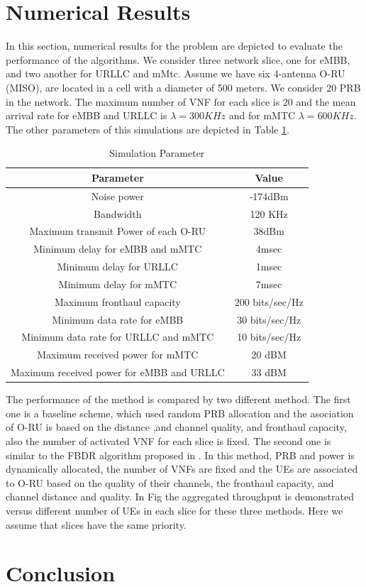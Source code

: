 \documentclass[conference]{IEEEtran}
\begin{document}
\section{Numerical Results}\label{NE}
In this section, numerical results for the problem are depicted to evaluate the performance of the algorithms. We consider three network slice, one for eMBB, and two another for URLLC and mMtc.
Assume we have six 4-antenna O-RU (MISO), are located in a cell with a diameter of 500 meters. We consider 20 PRB
in the network.
The maximum number of VNF for each slice is 20 and the mean arrival rate for eMBB and URLLC is $\lambda  = 300KHz$ and for mMTC $\lambda  = 600KHz$. 
The other parameters of this simulations are depicted in Table \ref{table:1a}.
\begin{table}
 \caption {Simulation Parameter} \label{table:1a}
 \begin{center}
  \begin{tabular}{||c c ||}
  \hline
Parameter & Value \\ [0.5ex]
  \hline\hline
  Noise power & -174dBm\\
  \hline
  Bandwidth & 120 KHz \\
  \hline
 Maximum transmit Power of each O-RU & 38dBm \\
  \hline
  Minimum delay for eMBB and mMTC &  4msec \\
  \hline
    Minimum delay for URLLC &  1msec \\
  \hline
  Minimum delay for mMTC &  7msec \\
  \hline
  Maximum fronthaul capacity  & 200 bits/sec/Hz \\
   \hline
  Minimum data rate for eMBB &  30 bits/sec/Hz \\ 
  \hline
   Minimum data rate for URLLC and mMTC &  10 bits/sec/Hz \\ 
  \hline
   Maximum received power for mMTC &  20 dBM \\ [.5ex]   
  \hline
    Maximum received power for eMBB and URLLC &  33 dBM \\ [.5ex]   
  \hline
 \end{tabular}
 \end{center}
 \end{table}
 The performance of the method is compared by two different method. The first one is a baseline scheme, which used random PRB allocation and the asociation of O-RU is based on the distance ,and channel quality, and fronthaul capacity, also the number of activated VNF for each slice is fixed. The second one is similar to the FBDR algorithm proposed in \cite{lee2018dynamic}. In this method, PRB and power is dynamically allocated, the number of VNFs are fixed and the UEs are associated to O-RU based on the quality of their channels, the fronthaul capacity, and channel distance and quality.
In Fig the aggregated throughput is demonstrated versus different number of UEs in each slice for these three methods. Here we assume that slices have the same priority.
\section{Conclusion}\label{conc}


\end{document}
